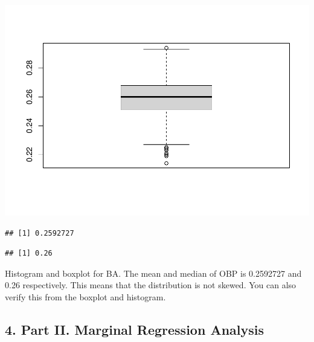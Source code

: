 \documentclass[
]{article}
\newenvironment{Shaded}{\begin{snugshade}}{\end{snugshade}}
\newcommand{\KeywordTok}[1]{\textcolor[rgb]{0.13,0.29,0.53}{\textbf{#1}}}
\newcommand{\NormalTok}[1]{#1}
\newcommand{\OperatorTok}[1]{\textcolor[rgb]{0.81,0.36,0.00}{\textbf{#1}}}
\begin{document}
\includegraphics{HW2_Liu-Zi-Jian_files/figure-latex/unnamed-chunk-32-2.pdf}

\begin{Shaded}
\end{Shaded}

\begin{verbatim}
## [1] 0.2592727
\end{verbatim}

\begin{Shaded}
\end{Shaded}

\begin{verbatim}
## [1] 0.26
\end{verbatim}

Histogram and boxplot for BA. The mean and median of OBP is 0.2592727
and 0.26 respectively. This means that the distribution is not skewed.
You can also verify this from the boxplot and histogram.

\hypertarget{part-ii.-marginal-regression-analysis-1}{%
\subsection{4. Part II. Marginal Regression
Analysis}\label{part-ii.-marginal-regression-analysis-1}}
\end{document}
